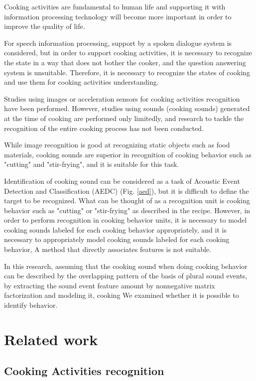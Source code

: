 \documentclass[sigconf,anonymous]{acmart}
\begin{document}
Cooking activities are fundamental to human life and supporting it with information processing technology will become more important in order to improve the quality of life\cite{Uriu2012}.

For speech information processing, support by a spoken dialogue system is considered, but in order to support cooking activities, it is necessary to recognize the state in a way that does not bother the cooker, and the question answering system is unsuitable. Therefore, it is necessary to recognize the states of cooking and use them for cooking activities understanding.

Studies using images or acceleration sensors for cooking activities recognition have been performed\cite{Torre2008}\cite{Shimada2013}\cite{Kuehne2014}.
However, studies using sounds (cooking sounds) generated at the time of cooking are performed only limitedly\cite{Kojima2016}, and research to tackle the recognition of the entire cooking process has not been conducted.

While image recognition is good at recognizing static objects such as food materials, cooking sounds are superior in recognition of cooking behavior such as "cutting" and "stir-frying", and it is suitable for this task.

Identification of cooking sound can be considered as a task of Acoustic Event Detection and Classification (AEDC) (Fig. \ref{aed}), but it is difficult to define the target to be recognized.
What can be thought of as a recognition unit is cooking behavior such as "cutting" or "stir-frying" as described in the recipe. However, in order to perform recognition in cooking behavior units, it is necessary to model cooking sounds labeled for each cooking behavior appropriately, and it is necessary to appropriately model cooking sounds labeled for each cooking behavior, A method that directly associates features is not suitable\cite{Maijala2018}.

In this research, assuming that the cooking sound when doing cooking behavior can be described by the overlapping pattern of the basis of plural sound events, by extracting the sound event feature amount by nonnegative matrix factorization and modeling it, cooking We examined whether it is possible to identify behavior.

\section{Related work}
\subsection{Cooking Activities recognition}
\end{document}
